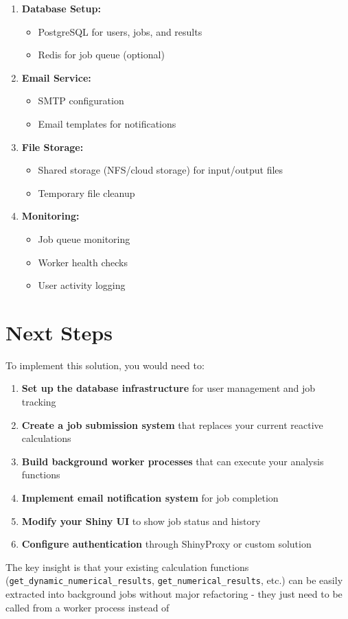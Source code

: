 \documentclass{article}
\begin{document}
\begin{enumerate}
\item \textbf{Database Setup:}
   \begin{itemize}
   \item PostgreSQL for users, jobs, and results
   \item Redis for job queue (optional)
   \end{itemize}

\item \textbf{Email Service:}
   \begin{itemize}
   \item SMTP configuration
   \item Email templates for notifications
   \end{itemize}

\item \textbf{File Storage:}
   \begin{itemize}
   \item Shared storage (NFS/cloud storage) for input/output files
   \item Temporary file cleanup
   \end{itemize}

\item \textbf{Monitoring:}
   \begin{itemize}
   \item Job queue monitoring
   \item Worker health checks
   \item User activity logging
   \end{itemize}
\end{enumerate}

\section{Next Steps}

To implement this solution, you would need to:

\begin{enumerate}
\item \textbf{Set up the database infrastructure} for user management and job tracking
\item \textbf{Create a job submission system} that replaces your current reactive calculations
\item \textbf{Build background worker processes} that can execute your analysis functions
\item \textbf{Implement email notification system} for job completion
\item \textbf{Modify your Shiny UI} to show job status and history
\item \textbf{Configure authentication} through ShinyProxy or custom solution
\end{enumerate}

The key insight is that your existing calculation functions (\texttt{get\_dynamic\_numerical\_results}, \texttt{get\_numerical\_results}, etc.) can be easily extracted into background jobs without major refactoring - they just need to be called from a worker process instead of
\end{document}
